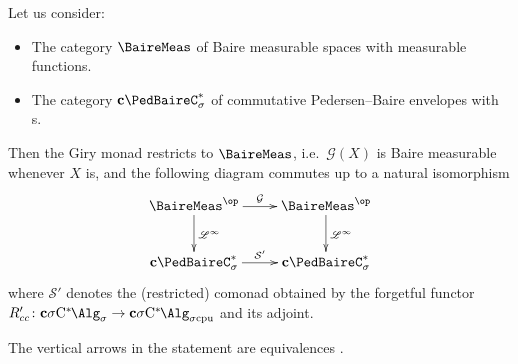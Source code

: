 \begin{theorem}\label{thm:giry_restriction}
	Let us consider:
	\begin{itemize}
		\item The category $\BaireMeas$ of Baire measurable spaces with measurable functions.
		\item The category $\cPBenv$ of commutative Pedersen--Baire envelopes with \starshom{}s.
	\end{itemize}
	Then the Giry monad restricts to $\BaireMeas$, i.e.\ $\mathcal{G}(X)$ is Baire measurable whenever $X$ is, and the following diagram commutes up to a natural isomorphism
	\[
		\vxy{
		\BaireMeas^{\op}\ar[r]^-{\mathcal{G}}\ar[d]^{\Linf} & \BaireMeas^{\op} \ar[d]^{\Linf}\\
		\cPBenv \ar[r]^-{\mathcal{S}'} & \cPBenv}
	\]
	where $\mathcal{S}'$ denotes the (restricted) comonad obtained by the forgetful functor $R'_{cc}\colon \cSigmaC \to \cSigmaCcpu$ and its adjoint.

\end{theorem}
The vertical arrows in the statement are equivalences \cite[Corollary 4.2.9]{fritz2025categories}.
